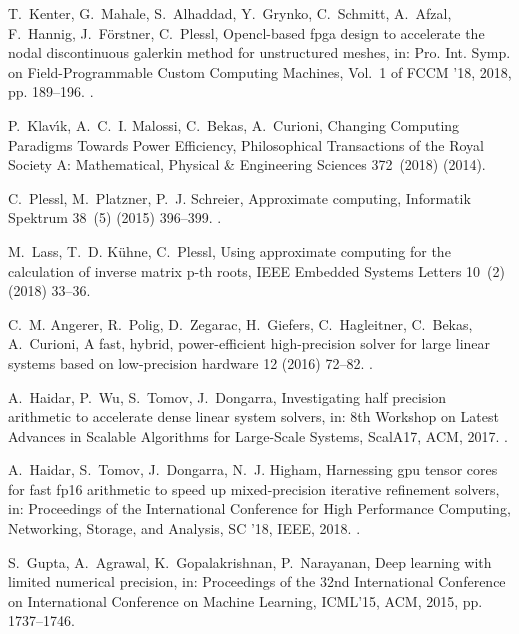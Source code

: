\documentclass[preprint]{elsarticle}
\begin{document}
\begin{thebibliography}{10}
T.~Kenter, G.~Mahale, S.~Alhaddad, Y.~Grynko, C.~Schmitt, A.~Afzal, F.~Hannig,
  J.~F\"orstner, C.~Plessl, Opencl-based fpga design to accelerate the nodal
  discontinuous galerkin method for unstructured meshes, in: Pro. Int. Symp. on
  Field-Programmable Custom Computing Machines, Vol.~1 of FCCM '18, 2018, pp.
  189--196.
\newblock \href {https://doi.org/10.1109/FCCM.2018.00037}
  {}.

P.~Klav{\'\i}k, A.~C.~I. Malossi, C.~Bekas, A.~Curioni, {Changing Computing
  Paradigms Towards Power Efficiency}, Philosophical Transactions of the Royal
  Society {A}: Mathematical, Physical \& Engineering Sciences 372~(2018)
  (2014).

C.~Plessl, M.~Platzner, P.~J. Schreier, Approximate computing, Informatik
  Spektrum 38~(5) (2015) 396--399.
\newblock \href {https://doi.org/10.1007/s00287-015-0911-z}
  {}.

M.~Lass, T.~D. K\"uhne, C.~Plessl, Using approximate computing for the
  calculation of inverse matrix p-th roots, IEEE Embedded Systems Letters
  10~(2) (2018) 33--36.

C.~M. Angerer, R.~Polig, D.~Zegarac, H.~Giefers, C.~Hagleitner, C.~Bekas,
  A.~Curioni, A fast, hybrid, power-efficient high-precision solver for large
  linear systems based on low-precision hardware 12 (2016) 72--82.
\newblock \href {https://doi.org/10.1016/j.suscom.2015.10.001}
  {}.

A.~Haidar, P.~Wu, S.~Tomov, J.~Dongarra, Investigating half precision
  arithmetic to accelerate dense linear system solvers, in: 8th Workshop on
  Latest Advances in Scalable Algorithms for Large-Scale Systems, ScalA17, ACM,
  2017.
\newblock \href {https://doi.org/10.1145/3148226.3148237}
  {}.

A.~Haidar, S.~Tomov, J.~Dongarra, N.~J. Higham, Harnessing gpu tensor cores for
  fast fp16 arithmetic to speed up mixed-precision iterative refinement
  solvers, in: Proceedings of the International Conference for High Performance
  Computing, Networking, Storage, and Analysis, SC '18, IEEE, 2018.
\newblock \href {https://doi.org/10.1109/SC.2018.00050}
  {}.

S.~Gupta, A.~Agrawal, K.~Gopalakrishnan, P.~Narayanan, Deep learning with
  limited numerical precision, in: Proceedings of the 32nd International
  Conference on International Conference on Machine Learning, ICML'15, ACM,
  2015, pp. 1737--1746.


\end{thebibliography}
\end{document}
